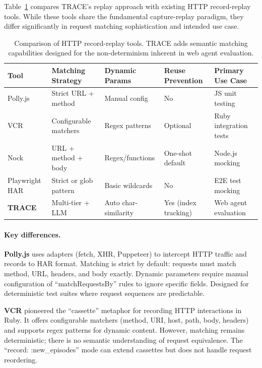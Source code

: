 \documentclass[letterpaper]{article}
\begin{document}
Table~\ref{tab:replay-comparison} compares TRACE's replay approach with existing HTTP record-replay tools. While these tools share the fundamental capture-replay paradigm, they differ significantly in request matching sophistication and intended use case.

\begin{table}[t]
\caption{Comparison of HTTP record-replay tools. TRACE adds semantic matching capabilities designed for the non-determinism inherent in web agent evaluation.}
\label{tab:replay-comparison}
\vskip 0.1in
\centering
\small
\begin{tabular}{@{}lllll@{}}
\toprule
\textbf{Tool} & \textbf{Matching Strategy} & \textbf{Dynamic Params} & \textbf{Reuse Prevention} & \textbf{Primary Use Case} \\
\midrule
Polly.js & Strict URL + method & Manual config & No & JS unit testing \\
VCR & Configurable matchers & Regex patterns & Optional & Ruby integration tests \\
Nock & URL + method + body & Regex/functions & One-shot default & Node.js mocking \\
Playwright HAR & Strict or glob pattern & Basic wildcards & No & E2E test mocking \\
\midrule
\textbf{TRACE} & Multi-tier + LLM & Auto char-similarity & Yes (index tracking) & Web agent evaluation \\
\bottomrule
\end{tabular}
\end{table}

\paragraph{Key differences.}

\textbf{Polly.js} \citep{pollyjs2018} uses adapters (fetch, XHR, Puppeteer) to intercept HTTP traffic and records to HAR format. Matching is strict by default: requests must match method, URL, headers, and body exactly. Dynamic parameters require manual configuration of ``matchRequestsBy'' rules to ignore specific fields. Designed for deterministic test suites where request sequences are predictable.

\textbf{VCR} \citep{vcr2011} pioneered the ``cassette'' metaphor for recording HTTP interactions in Ruby. It offers configurable matchers (method, URI, host, path, body, headers) and supports regex patterns for dynamic content. However, matching remains deterministic; there is no semantic understanding of request equivalence. The ``record: :new\_episodes'' mode can extend cassettes but does not handle request reordering.
\end{document}
